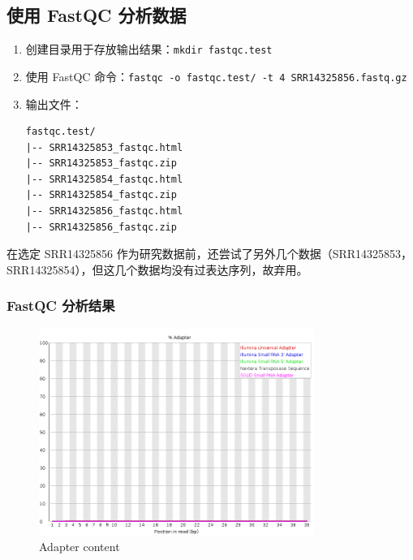\documentclass[UTF8]{ctexart}
\begin{document}
\subsection{使用 FastQC 分析数据}

\begin{enumerate}
	\item 创建目录用于存放输出结果：\verb|mkdir fastqc.test|
	\item 使用 FastQC 命令：\verb|fastqc -o fastqc.test/ -t 4 SRR14325856.fastq.gz |
	\item 输出文件：
	\begin{lstlisting}
fastqc.test/
|-- SRR14325853_fastqc.html
|-- SRR14325853_fastqc.zip
|-- SRR14325854_fastqc.html
|-- SRR14325854_fastqc.zip
|-- SRR14325856_fastqc.html
|-- SRR14325856_fastqc.zip
	\end{lstlisting}
\end{enumerate}

在选定 SRR14325856 作为研究数据前，还尝试了另外几个数据（SRR14325853，\\SRR14325854），但这几个数据均没有过表达序列，故弃用。

\subsubsection{FastQC 分析结果}

\clearpage

\begin{figure}[!htb]
	\centering
	\includegraphics[width=0.8\textwidth]{img/SRR14325859_FastQC_Origin_img/adapter_content.png}	%
	\caption{Adapter content\protect}    %
\end{figure}
\end{document}
